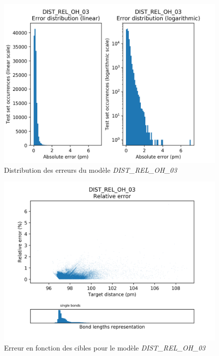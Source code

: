 
\begin{figure}[!h]
	\centering
	
	\includegraphics[scale=0.8]{../figures/DIST_REL_OH_03/DIST_REL_OH_03_distrib_rmse_val.png}	
	
	\caption{Distribution des erreurs du modèle \emph{DIST\_REL\_OH\_03}}
\end{figure}

\begin{figure}[!h]
	\centering
	
	\includegraphics[scale=0.8]{../figures/DIST_REL_OH_03/DIST_REL_OH_03_distrib_rmse_dist.png}	
	
	\caption{Erreur en fonction des cibles pour le modèle \emph{DIST\_REL\_OH\_03}}
\end{figure}

